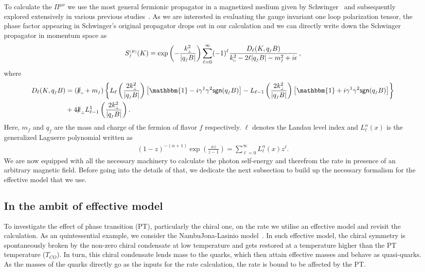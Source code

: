 \documentclass[aps,prd,floatfix,showpacs,showkeys,superscriptadress,unsortedaddress,nofootinbib,onecolumn]{revtex4-1}
\newcommand{\sF}{\scriptscriptstyle{f}}
\newcommand{\sB}{\scriptscriptstyle{(B)}}
\newcommand{\sperp}{\scriptscriptstyle{\perp}}
\newcommand{\shp}{\shortparallel}
\newcommand{\nn}{\nonumber \\}
\begin{document}
To calculate the $\Pi^{\mu\nu}$ we use the most general fermionic propagator in a magnetized medium given by Schwinger~\cite{Schwinger:1951nm} and subsequently explored extensively in various previous studies~\cite{Gusynin:1995nb}. As we are interested in evaluating the gauge invariant one loop polarization tensor, the phase factor appearing in Schwinger's original propagator drops out in our calculation and we can directly write down the Schwinger propagator in momentum space as
\begin{align}
S^{\sB}_{\sF}(K) = \exp\left(-\frac{k_{\sperp}^2}{|q_{\sF}B|}\right)\sum_{\ell=0}^{\infty}(-1)^{\ell}\frac{D_{\ell}(K,q_{\sF}B)}{k_{\shp}^2-2\ell|q_{\sF}B|-m_{\sF}^2+i\epsilon}\,,
\label{eq:schwinger_prop_mom}
\end{align}
where 
\begin{align}
D_{\ell}(K,q_{\sF}B)&=(\slashed{k}_{\shp}+m_{\sF})\left\{L_{\ell}\left(\frac{2k_{\sperp}^2}{|q_{\sF}B|}\right)\left[\mathbbm{1}-i\gamma^1\gamma^2\textsf{sgn}(q_{\sF}B)\right]-L_{\ell-1}\left(\frac{2k_{\sperp}^2}{|q_{\sF}B|}\right)\left[\mathbbm{1}+i\gamma^1\gamma^2\textsf{sgn}(q_{\sF}B)\right]\right\}\nn
&+4\slashed{k}_{\sperp}L^{1}_{\ell-1}\left(\frac{2k_{\sperp}^2}{|q_{\sF}B|}\right).
\end{align}
Here, $m_f$ and $q_f$ are the mass and charge of the fermion of flavor $f$ respectively. $\ell$ denotes the Landau level index and $L_{\ell}^{\alpha} (x)$ is the generalized Laguerre polynomial written as
\begin{align}
(1-z)^{-(\alpha+1)}\exp\left(\frac{xz}{z-1}\right) = \sum_{\ell =0}^{\infty} L_{\ell}^\alpha(x) z^{\ell}. \label{eq:Laguerre_generating}
\end{align}
We are now equipped with all the necessary machinery to calculate the photon self-energy and therefrom the rate in presence of an arbitrary magnetic field. Before going into the details of that, we dedicate the next subsection to build up the necessary formalism for the effective model that we use. 

\subsection{In the ambit of effective model}
\label{ssec:form_eff}
To investigate the effect of phase transition (PT), particularly the chiral one, on the rate we utilise an effective model and revisit the calculation. As an quintessential example, we consider the Nambu\textemdash Jona-Lasinio model~\cite{Nambu:1961tp,Nambu:1961fr}. In such effective model, the chiral symmetry is spontaneously broken by the non-zero chiral condensate at low temperature and gets restored at a temperature higher than the PT temperature ($T_{CO}$). In turn, this chiral condensate lends mass to the quarks, which then attain effective masses and behave as quasi-quarks. As the masses of the quarks directly go as the inputs for the rate calculation, the rate is bound to be affected by the PT.
\end{document}
